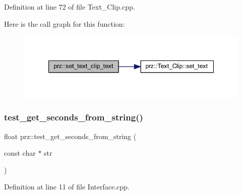 Definition at line 72 of file Text\+\_\+\+Clip.\+cpp.

Here is the call graph for this function\+:
\nopagebreak
\begin{figure}[H]
\begin{center}
\leavevmode
\includegraphics[width=347pt]{namespaceprz_add7a0ed63b75c519ee18b435f6883f50_cgraph}
\end{center}
\end{figure}
\mbox{\label{namespaceprz_aaac44f3182371ce344cce0720e1b823a}} 
\subsubsection{\texorpdfstring{test\_get\_seconds\_from\_string()}{test\_get\_seconds\_from\_string()}}
{\footnotesize\ttfamily float prz\+::test\+\_\+get\+\_\+seconds\+\_\+from\+\_\+string (\begin{DoxyParamCaption}\item[{const char $\ast$}]{str }\end{DoxyParamCaption})}



Definition at line 11 of file Interface.\+cpp.

